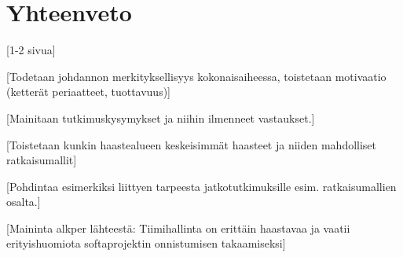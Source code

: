 \chapter{Yhteenveto\label{conclusions}}

[1-2 sivua]

[Todetaan johdannon merkityksellisyys kokonaisaiheessa, toistetaan motivaatio (ketterät periaatteet, tuottavuus)]

[Mainitaan tutkimuskysymykset ja niihin ilmenneet vastaukset.]

[Toistetaan kunkin haastealueen keskeisimmät haasteet ja niiden mahdolliset ratkaisumallit]

[Pohdintaa esimerkiksi liittyen tarpeesta jatkotutkimuksille esim. ratkaisumallien osalta.]

[Maininta alkper lähteestä: Tiimihallinta on erittäin haastavaa ja vaatii erityishuomiota softaprojektin onnistumisen takaamiseksi]
